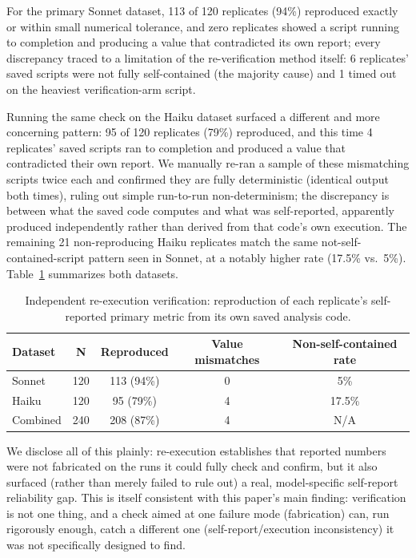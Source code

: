 \documentclass{article}
\begin{document}
For the primary Sonnet dataset, 113 of 120 replicates (94\%) reproduced exactly or within
small numerical tolerance, and zero replicates showed a script running to completion and
producing a value that contradicted its own report; every discrepancy traced to a
limitation of the re-verification method itself: 6 replicates' saved scripts were not
fully self-contained (the majority cause) and 1 timed out on the heaviest verification-arm
script.

Running the same check on the Haiku dataset surfaced a different and more concerning
pattern: 95 of 120 replicates (79\%) reproduced, and this time 4 replicates' saved scripts
ran to completion and produced a value that contradicted their own report. We manually
re-ran a sample of these mismatching scripts twice each and confirmed they are fully
deterministic (identical output both times), ruling out simple run-to-run non-determinism;
the discrepancy is between what the saved code computes and what was self-reported,
apparently produced independently rather than derived from that code's own execution. The
remaining 21
non-reproducing Haiku replicates match the same not-self-contained-script pattern seen in
Sonnet, at a notably higher rate (17.5\% vs.\ 5\%). Table~\ref{tab:verification}
summarizes both datasets.

\begin{table}[h]
  \caption{Independent re-execution verification: reproduction of each replicate's
  self-reported primary metric from its own saved analysis code.}
  \label{tab:verification}
  \centering
  \footnotesize
  \begin{tabular}{lcccc}
    \toprule
    Dataset & N & Reproduced & Value mismatches & Non-self-contained rate \\
    \midrule
    Sonnet & 120 & 113 (94\%) & 0 & 5\% \\
    Haiku & 120 & 95 (79\%) & 4 & 17.5\% \\
    Combined & 240 & 208 (87\%) & 4 & N/A \\
    \bottomrule
  \end{tabular}
\end{table}

We disclose all of this plainly: re-execution establishes that reported numbers were not
fabricated on the runs it could fully check and confirm, but it also surfaced (rather
than merely failed to rule out) a real, model-specific self-report reliability
gap. This is itself consistent with this paper's main finding: verification is not one
thing, and a check aimed at one failure mode (fabrication) can, run rigorously enough,
catch a different one (self-report/execution inconsistency) it was not specifically
designed to find.
\end{document}
